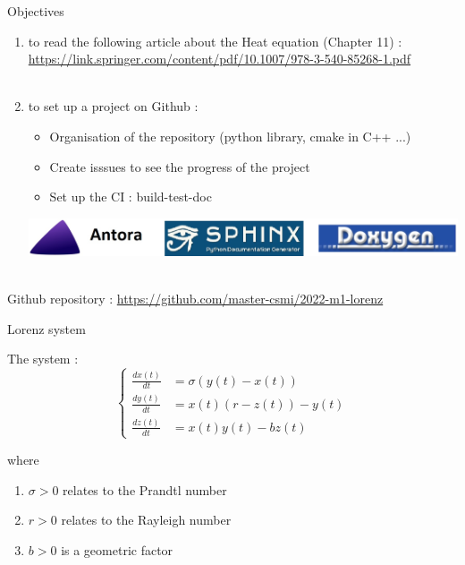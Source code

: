 \documentclass[10pt,xcolor={table,dvipsnames},t]{beamer}
\begin{document}
	\begin{frame}{Objectives}
		
		\begin{enumerate}[\textbullet]
			\item to read the following article about the Heat equation (Chapter 11) : \\ \url{https://link.springer.com/content/pdf/10.1007/978-3-540-85268-1.pdf} \\ \; \\
			\item to set up a project on Github :
			\begin{itemize}
				\item Organisation of the repository (python library, cmake in C++ ...)
				\item Create isssues to see the progress of the project
				\item Set up the CI : build-test-doc 
			\end{itemize}
			\includegraphics[width=\linewidth]{images/intro/logo.jpg}
		\end{enumerate} \; \\
		Github repository : \url{https://github.com/master-csmi/2022-m1-lorenz}
	
	\end{frame}
	
	\begin{frame}{Lorenz system}
		
		The system :
		$$\left\{\begin{aligned} 
			\frac{d x(t)}{d t} &=\sigma(y(t)-x(t))\\
			\frac{d y(t)}{d t}&=x(t)(r-z(t))-y(t) \\
			\frac{d z(t)}{d t}&=x(t)y(t)-bz(t)
		\end{aligned}\right.$$
	
		where
		
		\begin{enumerate}[\textbullet]
			\item $\sigma > 0$  relates to the Prandtl number
			\item $r > 0$  relates to the Rayleigh number
			\item $b > 0$ is a geometric factor
		\end{enumerate}
		
	\end{frame}
\end{document}
